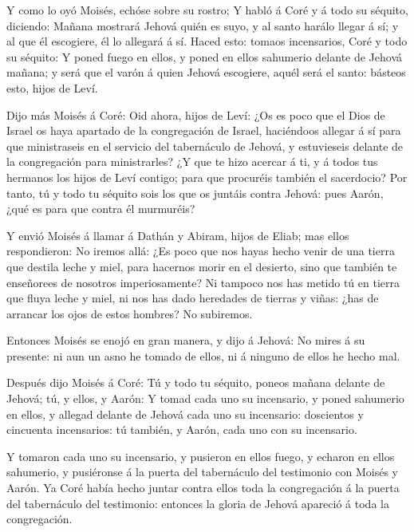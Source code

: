  Y como lo oyó Moisés, echóse sobre su rostro; 
Y habló á Coré y á todo su séquito, diciendo: Mañana mostrará Jehová
quién es suyo, y al santo harálo llegar á sí; y al que él escogiere, él
lo allegará á sí.  Haced esto: tomaos incensarios, Coré y
todo su séquito:  Y poned fuego en ellos, y poned en ellos
sahumerio delante de Jehová mañana; y será que el varón á quien Jehová
escogiere, aquél será el santo: básteos esto, hijos de Leví.

 Dijo más Moisés á Coré: Oid ahora, hijos de Leví:
 ¿Os es poco que el Dios de Israel os haya apartado de la
congregación de Israel, haciéndoos allegar á sí para que ministraseis en
el servicio del tabernáculo de Jehová, y estuvieseis delante de la
congregación para ministrarles?  ¿Y que te hizo acercar á
ti, y á todos tus hermanos los hijos de Leví contigo; para que procuréis
también el sacerdocio?  Por tanto, tú y todo tu séquito
sois los que os juntáis contra Jehová: pues Aarón, ¿qué es para que
contra él murmuréis?

 Y envió Moisés á llamar á Dathán y Abiram, hijos de Eliab;
mas ellos respondieron: No iremos allá:  ¿Es poco que nos
hayas hecho venir de una tierra que destila leche y miel, para hacernos
morir en el desierto, sino que también te enseñorees de nosotros
imperiosamente?  Ni tampoco nos has metido tú en tierra que
fluya leche y miel, ni nos has dado heredades de tierras y viñas: ¿has
de arrancar los ojos de estos hombres? No subiremos.

 Entonces Moisés se enojó en gran manera, y dijo á Jehová:
No mires á su presente: ni aun un asno he tomado de ellos, ni á ninguno
de ellos he hecho mal.

 Después dijo Moisés á Coré: Tú y todo tu séquito, poneos
mañana delante de Jehová; tú, y ellos, y Aarón:  Y tomad
cada uno su incensario, y poned sahumerio en ellos, y allegad delante de
Jehová cada uno su incensario: doscientos y cincuenta incensarios: tú
también, y Aarón, cada uno con su incensario.

 Y tomaron cada uno su incensario, y pusieron en ellos
fuego, y echaron en ellos sahumerio, y pusiéronse á la puerta del
tabernáculo del testimonio con Moisés y Aarón.  Ya Coré
había hecho juntar contra ellos toda la congregación á la puerta del
tabernáculo del testimonio: entonces la gloria de Jehová apareció á toda
la congregación.

